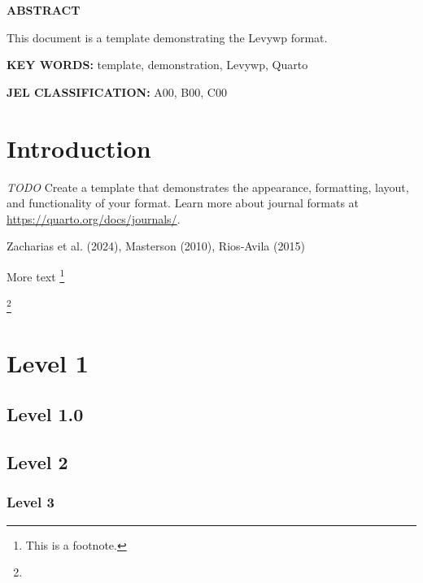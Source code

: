 \documentclass[
  12pt,
]{article}
\begin{document}
\textbf{ABSTRACT}

\vspace{1.5em}

This document is a template demonstrating the Levywp format. \lipsum[1]

\vspace{1.5em}

\textbf{KEY WORDS:} template, demonstration, Levywp, Quarto

\textbf{JEL CLASSIFICATION:} A00, B00, C00

\newpage{}

\section{Introduction}\label{sec-intro}

\emph{TODO} Create a template that demonstrates the appearance,
formatting, layout, and functionality of your format. Learn more about
journal formats at \url{https://quarto.org/docs/journals/}.

Zacharias et al. (2024), Masterson (2010), Rios‐Avila (2015)

\lipsum[1-2]

More text \footnote{This is a footnote.}

\lipsum[1] \footnote{\lipsum[1]}

\section{Level 1}\label{level-1}

\subsection{Level 1.0}\label{level-1.0}

\lipsum[1-2]

\subsection{Level 2}\label{level-2}

\lipsum[1-2]

\subsubsection{Level 3}\label{level-3}

\begin{table}[H]

\caption{\label{tbl-one}\textbf{Title here}}


\end{table}%
\end{document}
